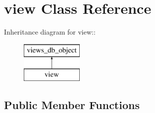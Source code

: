 \hypertarget{classview}{
\section{view Class Reference}
\label{classview}
}
Inheritance diagram for view::\begin{figure}[H]
\begin{center}
\leavevmode
\includegraphics[height=2cm]{classview}
\end{center}
\end{figure}
\subsection*{Public Member Functions}
